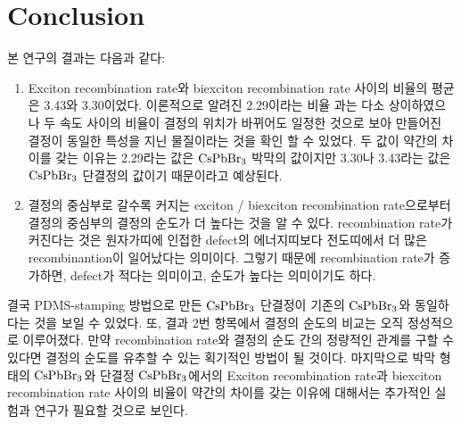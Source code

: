 \newpage

\section{Conclusion}
본 연구의 결과는 다음과 같다:
\begin{enumerate} 
	\item
	
	Exciton recombination rate와 biexciton recombination rate 사이의 비율의 평균은 3.43와 3.30이었다. 이론적으로 알려진 2.29이라는 비율\cite{chen2018room} 과는 다소 상이하였으나 두 속도 사이의 비율이 결정의 위치가 바뀌어도 일정한 것으로 보아 만들어진 결정이 동일한 특성을 지닌 물질이라는 것을 확인 할 수 있었다. 두 값이 약간의 차이를 갖는 이유는 2.29라는 값은 $\rm{CsPbBr_3}$ 박막의 값이지만 3.30나 3.43라는 값은 $\rm{CsPbBr_3}$ 단결정의 값이기 때문이라고 예상된다.  
	\item 결정의 중심부로 갈수록 커지는 exciton / biexciton recombination rate으로부터 결정의 중심부의 결정의 순도가 더 높다는 것을 알 수 있다. recombination rate가 커진다는 것은 원자가띠에 인접한 defect의 에너지띠보다 전도띠에서 더 많은 recombinantion이 일어났다는 의미이다. 그렇기 때문에 recombination rate가 증가하면, defect가 적다는 의미이고, 순도가 높다는 의미이기도 하다.
\end{enumerate}
결국 PDMS-stamping 방법으로 만든 $\rm{CsPbBr_3}$ 단결정이 기존의 $\rm{CsPbBr_3}$와 동일하다는 것을 보일 수 있었다. 또, 결과 2번 항목에서 결정의 순도의 비교는 오직 정성적으로 이루어졌다. 만약 recombination rate와 결정의 순도 간의 정량적인 관계를 구할 수 있다면 결정의 순도를 유추할 수 있는 획기적인 방법이 될 것이다.
마지막으로 박막 형태의 $\rm{CsPbBr_3}$와 단결정 $\rm{CsPbBr_3}$에서의 Exciton recombination rate과 biexciton recombination rate 사이의 비율이 약간의 차이를 갖는 이유에 대해서는 추가적인 실험과 연구가 필요할 것으로 보인다. 
